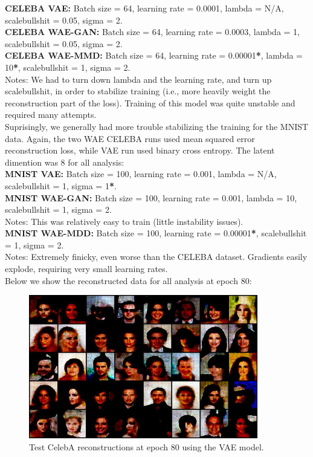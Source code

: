 \documentclass[12pt,english]{amsart}
\theoremstyle{definition}
\begin{document}
\textbf{CELEBA VAE:} Batch size = 64, learning rate = 0.0001, lambda = N/A,
scalebullshit = 0.05, sigma = 2. \\

\textbf{CELEBA WAE-GAN:} Batch size = 64, learning rate = 0.0003, lambda = 1,
scalebullshit = 0.05, sigma = 2. \\

\textbf{CELEBA WAE-MMD:} Batch size = 64, learning rate = 0.00001\textbf{*},
lambda = 10\textbf{*}, scalebullshit = 1, sigma = 2. \\

Notes: We had to turn down lambda and the learning rate, and turn up
scalebullshit, in order to stabilize training (i.e., more heavily weight the
reconstruction part of the loss). Training of this model was quite unstable and
required many attempts. \\

Suprisingly, we generally had more trouble stabilizing the training for the
MNIST data. Again, the two WAE CELEBA runs used mean squared error
reconstruction loss, while VAE run used binary cross entropy. The latent
dimention was 8 for all analysis: \\

\textbf{MNIST VAE:} Batch size = 100, learning rate = 0.001,
lambda = N/A, scalebullshit = 1, sigma = 1\textbf{*}. \\

\textbf{MNIST WAE-GAN:} Batch size = 100, learning rate = 0.001, lambda = 10,
scalebullshit = 1, sigma = 2. \\

Notes: This was relatively easy to train (little instability issues). \\

\textbf{MNIST WAE-MDD:} Batch size = 100, learning rate = 0.00001\textbf{*},
scalebullshit = 1, sigma = 2. \\

Notes: Extremely finicky, even worse than the CELEBA dataset. Gradients easily
explode, requiring very small learning rates. \\

Below we show the reconstructed data for all analysis at epoch 80: \\

\begin{figure}[h]
\includegraphics[width=100mm]{celeb_vae_ep_79_recon}
\caption{Test CelebA reconstructions at epoch 80 using the VAE model.}
\label{Figure 2}
\end{figure}
\end{document}
